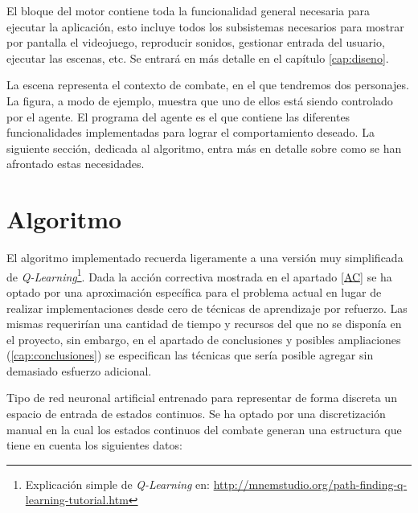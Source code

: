 El bloque del motor contiene toda la funcionalidad general necesaria para ejecutar la aplicación, esto incluye todos los subsistemas necesarios para mostrar por pantalla el videojuego, reproducir sonidos, gestionar entrada del usuario, ejecutar las escenas, etc. Se entrará en más detalle en el capítulo \ref{cap:diseno}.

\bigskip

La escena representa el contexto de combate, en el que tendremos dos personajes. La figura, a modo de ejemplo, muestra que uno de ellos está siendo controlado por el agente. El programa del agente es el que contiene las diferentes funcionalidades implementadas para lograr el comportamiento deseado. La siguiente sección, dedicada al algoritmo, entra más en detalle sobre como se han afrontado estas necesidades.


\section{Algoritmo}

El algoritmo implementado recuerda ligeramente a una versión muy simplificada de \textit{Q-Learning}\footnote{Explicación simple de \textit{Q-Learning} en:  \url{http://mnemstudio.org/path-finding-q-learning-tutorial.htm}}. Dada la acción correctiva mostrada en el apartado \ref{AC} se ha optado por una aproximación específica para el problema actual en lugar de realizar implementaciones desde cero de técnicas de aprendizaje por refuerzo. Las mismas requerirían una cantidad de tiempo y recursos del que no se disponía en el proyecto, sin embargo, en el apartado de conclusiones y posibles ampliaciones (\ref{cap:conclusiones}) se especifican las técnicas que sería posible agregar sin demasiado esfuerzo adicional.

\bigskip

{Tipo de red neuronal artificial entrenado para representar de forma discreta un espacio de entrada de estados continuos}. Se ha optado por una discretización manual en la cual los estados continuos del combate generan una estructura que tiene en cuenta los siguientes datos:


